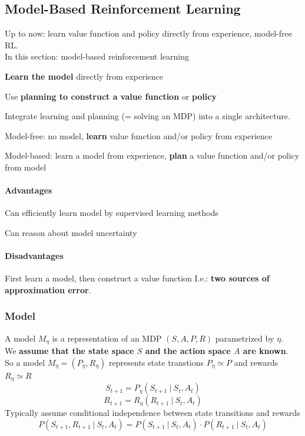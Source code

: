 \documentclass[10pt]{report}
\begin{document}
\subsection{Model-Based Reinforcement Learning}
Up to now: learn value function and policy directly from experience, model-free RL.\\
In this section: model-based reinforcement learning\begin{list}{}{}
	\item \textbf{Learn the model} directly from experience
	\item Use \textbf{planning to construct a value function} or \textbf{policy}
\end{list}
Integrate learning and planning (= solving an MDP) into a single architecture.
\begin{list}{}{}
	\item Model-free: no model, \textbf{learn} value function and/or policy from experience
	\item Model-based: learn a model from experience, \textbf{plan} a value function and/or policy from model
\end{list}
\paragraph{Advantages}\begin{list}{}{}
	\item Can efficiently learn model by supervised learning methods
	\item Can reason about model uncertainty
\end{list}
\paragraph{Disadvantages}\begin{list}{}{}
	\item First learn a model, then construct a value function
	I.e.: \textbf{two sources of approximation error}.
\end{list}
\subsubsection{Model}
A model $M_\eta$ is a representation of an MDP $(S,A,P,R)$ parametrized by $\eta$.\\
We \textbf{assume that the state space $S$ and the action space $A$ are known}.\\
So a model $M_\eta=(P_\eta,R_\eta)$ represents state transtions $P_\eta \simeq P$ and rewards $R_\eta \simeq R$
$$S_{t+1} = P_\eta(S_{t+1}\:|\:S_t,A_t)$$
$$R_{t+1} = R_\eta(R_{t+1}\:|\:S_t,A_t)$$
Typically assume conditional independence between state transitions and rewards
$$P(S_{t+1},R_{t+1}\:|\:S_t,A_t) = P(S_{t+1}\:|\:S_t,A_t)\cdot P(R_{t+1}\:|\:S_t,A_t)$$
\end{document}
